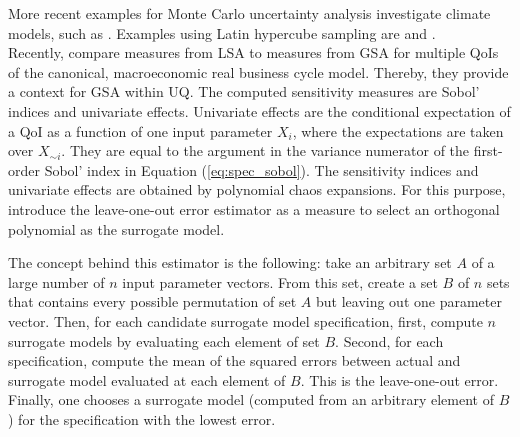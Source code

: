 \newline
More recent examples for Monte Carlo uncertainty analysis investigate climate models, such as \cite{Webster.2012}.
Examples using Latin hypercube sampling are \cite{Mattoo.2009} and \cite{Hope.2006}.\\
\newline
Recently, \cite{Harenberg.2019} compare measures from LSA to measures from GSA for multiple QoIs of the canonical, macroeconomic real business cycle model. Thereby, they provide a context for GSA within UQ. The computed sensitivity measures are Sobol' indices and univariate effects. Univariate effects are the conditional expectation of a QoI as a function of one input parameter $X_i$, where the expectations are taken over $X_{\sim i}$. They are equal to the argument in the variance numerator of the first-order Sobol' index in Equation (\ref{eq:spec_sobol}). The sensitivity indices and univariate effects are obtained by polynomial chaos expansions. For this purpose, \citeauthor{Harenberg.2019} introduce the leave-one-out error estimator as a measure to select an orthogonal polynomial as the surrogate model.

The concept behind this estimator is the following: take an arbitrary set $A$ of a large number of $n$ input parameter vectors. From this set, create a set $B$ of $n$ sets that contains every possible permutation of set $A$ but leaving out one parameter vector. Then, for each candidate surrogate model specification, first, compute $n$ surrogate models by evaluating each element of set $B$. Second, for each specification, compute the mean of the squared errors between actual and surrogate model evaluated at each element of $B$. This is the leave-one-out error. Finally, one chooses a surrogate model (computed from an arbitrary element of $B$) for the specification with the lowest error.

